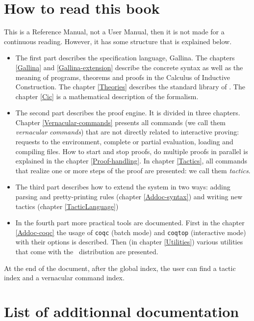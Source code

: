 \section*{How to read this book}

This is a Reference Manual, not a User Manual, then it is not made for a
continuous reading. However, it has some structure that is explained
below.

\begin{itemize}
\item The first part describes the specification language,
  Gallina. The chapters \ref{Gallina} and \ref{Gallina-extension}
  describe the concrete syntax as well as the meaning of programs,
  theorems and proofs in the Calculus of Inductive Construction. The
  chapter \ref{Theories} describes the standard library of \Coq. The
  chapter \ref{Cic} is a mathematical description of the formalism. 

\item The second part describes the proof engine. It is divided in
  three chapters. Chapter \ref{Vernacular-commands} presents
  all commands (we call them \textit{vernacular commands}) that are not
  directly related to interactive proving: requests to the environment,
  complete or partial evaluation, loading and compiling files. How to
  start and stop proofs, do multiple proofs in parallel is explained
  in the chapter \ref{Proof-handling}. In chapter \ref{Tactics}, 
  all commands that realize one or more steps of the proof are
  presented: we call them   \textit{tactics}. 

\item The third part describes how to extend the system in two ways:
  adding parsing and pretty-printing rules (chapter
  \ref{Addoc-syntax}) and writing new tactics (chapter
  \ref{TacticLanguage})


\item In the fourth part more practical tools are documented. First in
  the chapter \ref{Addoc-coqc} the usage of \texttt{coqc} (batch mode)
  and \texttt{coqtop} (interactive mode) with their options is
  described. Then (in chapter \ref{Utilities}) 
  various utilities that come with the \Coq\ distribution are presented.
\end{itemize}

At the end of the document, after the global index, the user can find
a tactic index and a vernacular command index.

\section*{List of additionnal documentation}

